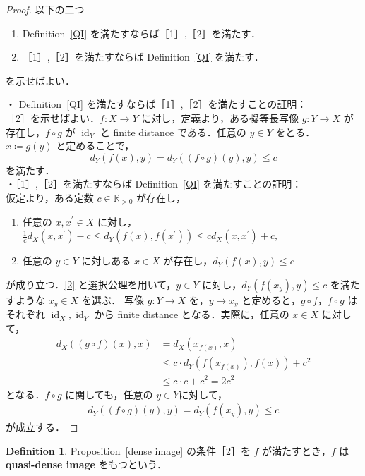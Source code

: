 \documentclass[dvipdfmx]{ujarticle}
\DeclareMathOperator{\id}{id}
\theoremstyle{definition}
\newtheorem{dfn}{Definition}[section]
\begin{document}
\begin{proof}
以下の二つ
\begin{enumerate}
  \item[・] Definition~\ref{QI} を満たすならば［1］,［2］を満たす．
  \item[・] ［1］,［2］を満たすならば Definition~\ref{QI} を満たす．
\end{enumerate}
を示せばよい．

\noindent
・ Definition~\ref{QI} を満たすならば［1］,［2］を満たすことの証明：\\
［2］を示せばよい．$f\colon X\rightarrow Y$ に対し，定義より，ある擬等長写像 $g\colon Y\rightarrow X$ が存在し，$f\circ g$ が $\id_Y$ と finite distance である．任意の $y\in Y$ をとる．$x\coloneqq g(y)$ と定めることで，
$$d_Y(f(x),y)=d_Y((f\circ g)(y),y)\leq c$$
を満たす．\\

\noindent
・［1］,［2］を満たすならば Definition~\ref{QI} を満たすことの証明：\\ 
仮定より，ある定数 $c\in\mathbb{R}_{>0}$ が存在し，
\begin{enumerate}
  \item 任意の $x,x^\prime \in X$ に対し，$\frac{1}{c}d_X(x,x^\prime)-c \leq d_Y(f(x),f(x^\prime)) \leq cd_X(x,x^\prime)+c,$\label{1}
  \item 任意の $y\in Y$ に対しある $x\in X$ が存在し，$d_Y(f(x),y)\leq c$\label{2}
\end{enumerate}
が成り立つ．\eqref{2} と選択公理を用いて，$y\in Y$ に対し，$d_Y(f(x_y),y)\leq c$ を満たすような $x_y\in X$ を選ぶ． 写像 $g\colon Y\rightarrow X$ を，$y\mapsto x_y$ と定めると，$g\circ f$，$f\circ g$ はそれぞれ $\id_X,\id_Y$ から finite distance となる．実際に，任意の $x\in X$ に対して，
\begin{align*}
  d_X((g\circ f)(x),x)&=d_X(x_{f(x)},x)\\
  &\leq c\cdot d_Y(f(x_{f(x)}),f(x)) +c^2\\
  &\leq c\cdot c +c^2=2c^2
\end{align*}
となる．$f\circ g$ に関しても，任意の $y\in Y$に対して，
\begin{align*}
  d_Y((f\circ g)(y),y)=d_Y(f(x_y),y)\leq c
\end{align*}
が成立する．
\end{proof}

\begin{dfn}
Proposition~\ref{dense image} の条件［2］を $f$ が満たすとき，$f$ は \textbf{quasi-dense image} をもつという．
\end{dfn}
\end{document}
